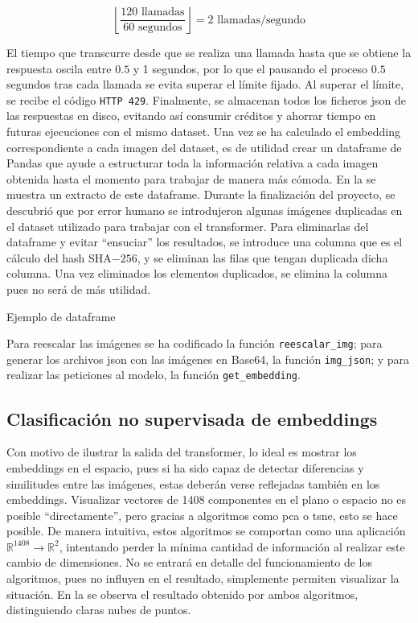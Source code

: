 				$$
				\left\lfloor\frac{120\text{ llamadas}}{60\text{ segundos}}\right\rfloor = 2 \text{ llamadas/segundo}
				$$
				
				El tiempo que transcurre desde que se realiza una llamada hasta que se obtiene la respuesta oscila entre $0.5$ y 1 segundos, por lo que el pausando el proceso $0.5$ segundos tras cada llamada se evita superar el límite fijado. Al superar el límite, se recibe el código \texttt{HTTP 429}. Finalmente, se almacenan todos los ficheros \gls{json} de las respuestas en disco, evitando así consumir  créditos y ahorrar tiempo en futuras ejecuciones con el mismo dataset. Una vez se ha calculado el embedding correspondiente a cada imagen del dataset, es de utilidad crear un dataframe de Pandas que ayude a estructurar toda la información relativa a cada imagen obtenida hasta el momento para trabajar de manera más cómoda. En la  se muestra un extracto de este dataframe. Durante la finalización del proyecto, se descubrió que por error humano se introdujeron algunas imágenes duplicadas en el dataset utilizado para trabajar con el transformer. Para eliminarlas del dataframe y evitar ``ensuciar'' los resultados, se introduce una columna que es el cálculo del hash SHA$-256$, y se eliminan las filas que tengan duplicada dicha columna. Una vez eliminados los elementos duplicados, se elimina la columna pues no será de más utilidad. 
				
				\begin{table}[!h]
					\scriptsize
					\centering
					\texttt{}
					\caption{Ejemplo de dataframe}
					\label{tab:df_ejemplo}
				\end{table}
				
				Para reescalar las imágenes se ha codificado la función \texttt{reescalar\_img}; para generar los archivos \gls{json} con las imágenes en Base64, la función \texttt{img\_json}; y para realizar las peticiones al modelo, la función \texttt{get\_embedding}. 
				
			\subsection{Clasificación no supervisada de embeddings}
				
				Con motivo de ilustrar la salida del transformer, lo ideal es mostrar los embeddings en el espacio, pues si ha sido capaz de detectar diferencias y similitudes entre las imágenes, estas deberán verse reflejadas también en los embeddings. Visualizar vectores de 1408 componentes en el plano o espacio no es posible ``directamente'', pero gracias a algoritmos como \gls{pca} o \gls{tsne}, esto se hace posible. De manera intuitiva, estos algoritmos se comportan como una aplicación $\mathbb{R}^{1408} \longrightarrow \mathbb{R}^2$, intentando perder la mínima cantidad de información al realizar este cambio de dimensiones. No se entrará en detalle del funcionamiento de los algoritmos, pues no influyen en el resultado, simplemente permiten visualizar la situación. En la  se observa el resultado obtenido por ambos algoritmos, distinguiendo claras nubes de puntos. 
				
